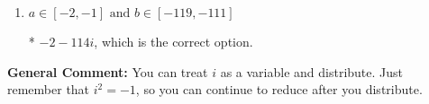 \documentclass{extbook}[14pt]
\begin{document}
\begin{enumerate}
{\begin{enumerate}[label=\Alph*.]
 $-110 - 30 i$, which corresponds to adding a minus sign in the first term.
\item \( a \in [-2, -1] \text{ and } b \in [-119, -111] \)

* $-2 - 114 i$, which is the correct option.
\end{enumerate}

\textbf{General Comment:} You can treat $i$ as a variable and distribute. Just remember that $i^2=-1$, so you can continue to reduce after you distribute.
}
\end{enumerate}
\end{document}
